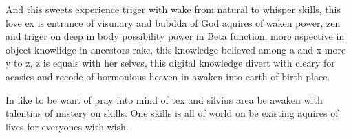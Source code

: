 \documentclass{jsarticle}
\begin{document}
	 
	     And this sweets experience triger with wake from natural to
	 whisper skills, this love ex is entrance of visunary and bubdda
	 of God aquires of waken power, zen and triger on deep in body
	 possibility power in Beta function, more aspective in
         object knowlidge in ancestors rake, this knowledge believed among
	 a and x more y to z, z is equals with her selves, this digital
	 knowledge divert with cleary for acasics and recode of hormonious
	 heaven in awaken into earth of birth place.


	    In like to be want of pray into mind of tex and silvius area
	 be awaken with talentius of mistery on skills.
	 One skills is all of world on be existing aquires of lives for 
	 everyones with wish.
\end{document}
